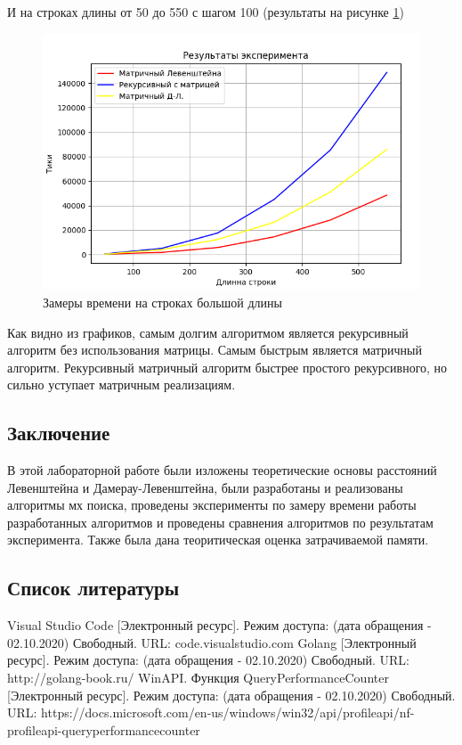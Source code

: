 \documentclass{article}
\begin{document}
	И на строках длины от 50 до 550 с шагом 100 (результаты на рисунке \ref{longTest})
	
	 	\begin{figure}[h!]
		 	\includegraphics[scale=0.9]{longTest}
		 	\caption{Замеры времени на строках большой длины}
		 	\label{longTest}
	 	\end{figure}
	 	\newpage
	Как видно из графиков, самым долгим алгоритмом является рекурсивный алгоритм без использования матрицы. Самым быстрым является матричный алгоритм. Рекурсивный матричный алгоритм быстрее простого рекурсивного, но сильно уступает матричным реализациям.
		\newpage
	\begin{center}
		\section*{Заключение}
	\end{center}
	В этой лабораторной работе были изложены теоретические основы расстояний Левенштейна и Дамерау-Левенштейна, были разработаны и реализованы алгоритмы  мх поиска, проведены эксперименты по замеру времени работы разработанных алгоритмов и проведены сравнения алгоритмов по результатам эксперимента. Также была дана теоритическая оценка затрачиваемой памяти.
	\newpage
	\begin{center}
		\section*{Список литературы}
	\end{center}
\begin{thebibliography}{2}
Visual Studio Code [Электронный ресурс]. Режим доступа: (дата обращения - 02.10.2020) Свободный. URL: code.visualstudio.com
Golang [Электронный ресурс]. Режим доступа: (дата обращения - 02.10.2020) Свободный. URL: http://golang-book.ru/
WinAPI. Функция QueryPerformanceCounter [Электронный ресурс]. Режим доступа: (дата обращения - 02.10.2020) Свободный. URL: https://docs.microsoft.com/en-us/windows/win32/api/profileapi/nf-profileapi-queryperformancecounter
\end{thebibliography}
\end{document}
